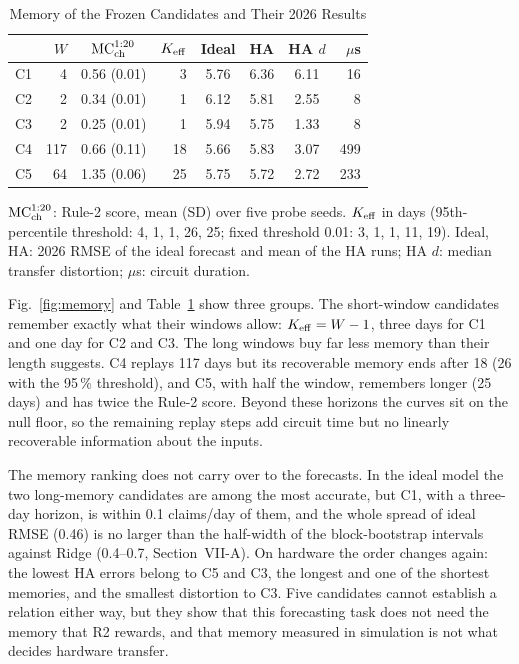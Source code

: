 \documentclass[journal]{IEEEtran}
\begin{document}
\begin{table}[t]
\centering
\caption{Memory of the Frozen Candidates and Their 2026 Results}
\label{tab:memory}
\footnotesize
\setlength{\tabcolsep}{3pt}
\begin{tabular}{@{}lrcrcccr@{}}
\toprule
 & $W$ & $\mathrm{MC}_{\rm ch}^{1:20}$ & $K_{\rm eff}$ & Ideal & HA & HA $d$ & $\mu$s \\
\midrule
C1 & 4 & 0.56 (0.01) & 3 & 5.76 & 6.36 & 6.11 & 16 \\
C2 & 2 & 0.34 (0.01) & 1 & 6.12 & 5.81 & 2.55 & 8 \\
C3 & 2 & 0.25 (0.01) & 1 & 5.94 & 5.75 & 1.33 & 8 \\
C4 & 117 & 0.66 (0.11) & 18 & 5.66 & 5.83 & 3.07 & 499 \\
C5 & 64 & 1.35 (0.06) & 25 & 5.75 & 5.72 & 2.72 & 233 \\
\bottomrule
\end{tabular}


\smallskip
\parbox{\columnwidth}{\scriptsize $\mathrm{MC}_{\rm ch}^{1:20}$: Rule-2 score, mean (SD) over five probe seeds. $K_{\rm eff}$ in days (95th-percentile threshold: 4, 1, 1, 26, 25; fixed threshold 0.01: 3, 1, 1, 11, 19). Ideal, HA: 2026 RMSE of the ideal forecast and mean of the HA runs; HA $d$: median transfer distortion; $\mu$s: circuit duration.}
\end{table}

Fig.~\ref{fig:memory} and Table~\ref{tab:memory} show three groups. The short-window candidates remember exactly what their windows allow: $K_{\rm eff}=W-1$, three days for C1 and one day for C2 and C3. The long windows buy far less memory than their length suggests. C4 replays 117 days but its recoverable memory ends after 18 (26 with the 95\,\% threshold), and C5, with half the window, remembers longer (25 days) and has twice the Rule-2 score. Beyond these horizons the curves sit on the null floor, so the remaining replay steps add circuit time but no linearly recoverable information about the inputs.

The memory ranking does not carry over to the forecasts. In the ideal model the two long-memory candidates are among the most accurate, but C1, with a three-day horizon, is within 0.1 claims/day of them, and the whole spread of ideal RMSE (0.46) is no larger than the half-width of the block-bootstrap intervals against Ridge (0.4--0.7, Section~VII-A). On hardware the order changes again: the lowest HA errors belong to C5 and C3, the longest and one of the shortest memories, and the smallest distortion to C3. Five candidates cannot establish a relation either way, but they show that this forecasting task does not need the memory that R2 rewards, and that memory measured in simulation is not what decides hardware transfer.
\end{document}
